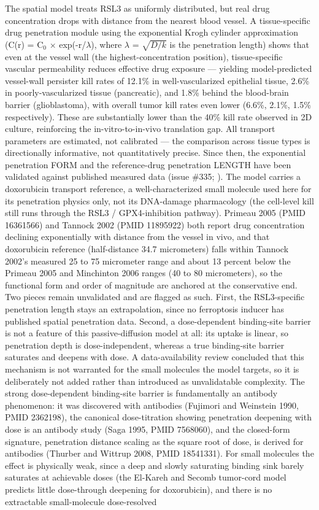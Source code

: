 \documentclass[11pt,twoside,openright]{report}
\begin{document}
The spatial model treats RSL3 as uniformly distributed, but real drug concentration drops with distance from the nearest blood vessel. A tissue-specific drug penetration module using the exponential Krogh cylinder approximation (C(r) = C$_0$ $\times$ exp(-r/$\lambda$), where $\lambda$ = $\sqrt{D/k}$ is the penetration length) shows that even at the vessel wall (the highest-concentration position), tissue-specific vascular permeability reduces effective drug exposure --- yielding model-predicted vessel-wall persister kill rates of 12.1\% in well-vascularized epithelial tissue, 2.6\% in poorly-vascularized tissue (pancreatic), and 1.8\% behind the blood-brain barrier (glioblastoma), with overall tumor kill rates even lower (6.6\%, 2.1\%, 1.5\% respectively). These are substantially lower than the 40\% kill rate observed in 2D culture, reinforcing the in-vitro-to-in-vivo translation gap. All transport parameters are estimated, not calibrated --- the comparison across tissue types is directionally informative, not quantitatively precise. Since then, the exponential penetration FORM and the reference-drug penetration LENGTH have been validated against published measured data (issue \#335; ). The model carries a doxorubicin transport reference, a well-characterized small molecule used here for its penetration physics only, not its DNA-damage pharmacology (the cell-level kill still runs through the RSL3 / GPX4-inhibition pathway). Primeau 2005 (PMID 16361566) and Tannock 2002 (PMID 11895922) both report drug concentration declining exponentially with distance from the vessel in vivo, and that doxorubicin reference (half-distance 34.7 micrometers) falls within Tannock 2002's measured 25 to 75 micrometer range and about 13 percent below the Primeau 2005 and Minchinton 2006 ranges (40 to 80 micrometers), so the functional form and order of magnitude are anchored at the conservative end. Two pieces remain unvalidated and are flagged as such. First, the RSL3-specific penetration length stays an extrapolation, since no ferroptosis inducer has published spatial penetration data. Second, a dose-dependent binding-site barrier is not a feature of this passive-diffusion model at all: its uptake is linear, so penetration depth is dose-independent, whereas a true binding-site barrier saturates and deepens with dose. A data-availability review concluded that this mechanism is not warranted for the small molecules the model targets, so it is deliberately not added rather than introduced as unvalidatable complexity. The strong dose-dependent binding-site barrier is fundamentally an antibody phenomenon: it was discovered with antibodies (Fujimori and Weinstein 1990, PMID 2362198), the canonical dose-titration showing penetration deepening with dose is an antibody study (Saga 1995, PMID 7568060), and the closed-form signature, penetration distance scaling as the square root of dose, is derived for antibodies (Thurber and Wittrup 2008, PMID 18541331). For small molecules the effect is physically weak, since a deep and slowly saturating binding sink barely saturates at achievable doses (the El-Kareh and Secomb tumor-cord model predicts little dose-through deepening for doxorubicin), and there is no extractable small-molecule dose-resolved 
\end{document}
